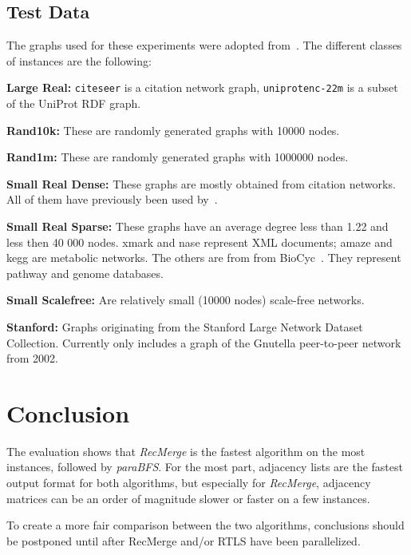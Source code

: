 \documentclass[12pt,a4paper,twoside]{article}
\begin{document}
\subsection{Test Data}

The graphs used for these experiments were adopted from~\cite{preach}. The different classes of instances are the following:
\begin{description}
  \item{\textbf{Large Real:}} \verb|citeseer| is a citation network graph, \verb|uniprotenc-22m| is a subset of the UniProt RDF graph.
  \item{\textbf{Rand10k:}} These are randomly generated graphs with 10000 nodes.
  \item{\textbf{Rand1m:}} These are randomly generated graphs with 1000000 nodes.
  \item{\textbf{Small Real Dense:}} These graphs are mostly obtained from citation networks. All of them have previously been used by~\cite{Jin:2009:HIS:1559845.1559930}.
  \item{\textbf{Small Real Sparse:}} These graphs have an average degree less than 1.22 and less then
    40 000 nodes. xmark and nase represent XML documents; amaze and kegg are metabolic
    networks. The others are from from BioCyc~\cite{grail}. They represent pathway and genome
    databases.
  \item{\textbf{Small Scalefree:}} Are relatively small (10000 nodes) scale-free networks.
  \item{\textbf{Stanford:}} Graphs originating from the Stanford Large Network Dataset Collection. Currently only includes a graph of the Gnutella peer-to-peer network from 2002.
\end{description}




\section{Conclusion}

The evaluation shows that \emph{RecMerge} is the fastest algorithm on the most instances, followed by \emph{paraBFS}. For the most part, adjacency lists are the fastest output format for both algorithms, but especially for \emph{RecMerge}, adjacency matrices can be an order of magnitude slower or faster on a few instances.

To create a more fair comparison between the two algorithms, conclusions should be postponed until after RecMerge and/or RTLS have been parallelized.



\end{document}
